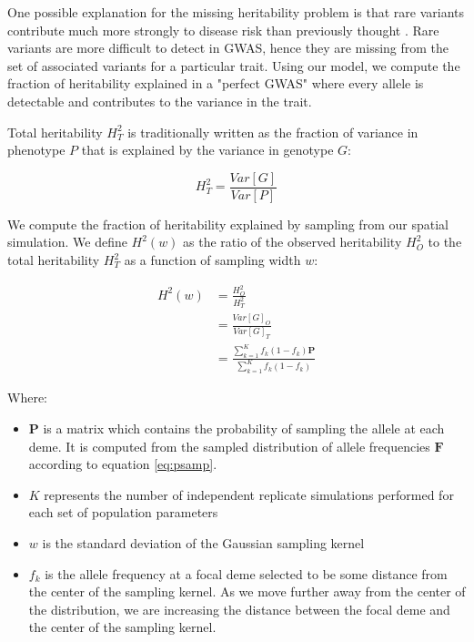 One possible explanation for the missing heritability problem is that rare variants contribute much more strongly to disease risk than previously thought \cite{saint_pierre_how_2014} \cite{marouli_rare_2017}. Rare variants are more difficult to detect in GWAS, hence they are missing from the set of associated variants for a particular trait. Using our model, we compute the fraction of heritability explained in a "perfect GWAS" where every allele is detectable and contributes to the variance in the trait. 

Total heritability $H^2_T$ is traditionally written as the fraction of variance in phenotype $P$ that is explained by the variance in genotype $G$:


\begin{equation}
    H^2_T = \frac{Var[G]}{Var[P]}
\end{equation}


We compute the fraction of heritability explained by sampling from our spatial simulation. We define $H^2(w)$ as the ratio of the observed heritability $H^2_O$ to the total heritability $H^2_T$ as a function of sampling width $w$:

\begin{equation}
    \begin{split}
        H^2(w) &= \frac{H^2_O}{H^2_T} \\
        &= \frac{Var[G]_O}{Var[G]_T} \\ 
        &= \frac{\sum_{k=1}^{K} f_k(1-f_k) \textbf{P}}{\sum_{k=1}^{K} f_k(1-f_k)}
    \end{split}
\end{equation}

Where:
\begin{itemize}
    \item $\textbf{P}$ is a matrix which contains the probability of sampling the allele at each deme. It is computed from the sampled distribution of allele frequencies $\textbf{F}$ according to equation \ref{eq:psamp}.
    \item $K$ represents the number of independent replicate simulations performed for each set of population parameters
    \item $w$ is the standard deviation of the Gaussian sampling kernel
    \item $f_k$ is the allele frequency at a focal deme selected to be some distance from the center of the sampling kernel. As we move further away from the center of the distribution, we are increasing the distance between the focal deme and the center of the sampling kernel.
\end{itemize}

